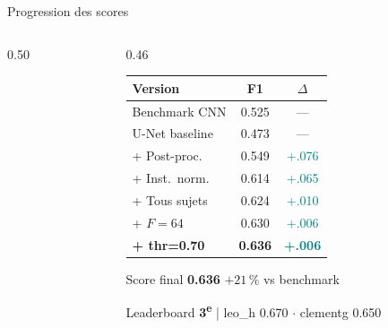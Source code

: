 \documentclass[aspectratio=169, 10pt]{beamer}
\begin{document}
\begin{frame}{Progression des scores}
    \begin{columns}[T]
        \begin{column}{0.50\textwidth}
        \end{column}
        \begin{column}{0.46\textwidth}
            \small
            \begin{tabular}{@{}lcc@{}}
                \toprule
                \textbf{Version} & \textbf{F1} & \textbf{$\Delta$} \\
                \midrule
                Benchmark CNN       & 0.525 & ---  \\
                U-Net baseline      & 0.473 & ---  \\
                + Post-proc.        & 0.549 & \textcolor{Teal}{+.076} \\
                + Inst.\ norm.      & 0.614 & \textcolor{Teal}{+.065} \\
                + Tous sujets       & 0.624 & \textcolor{Teal}{+.010} \\
                + $F\!=\!64$        & 0.630 & \textcolor{Teal}{+.006} \\
                \textbf{+ thr=0.70} & \textbf{0.636} & \textcolor{Teal}{\textbf{+.006}} \\
                \bottomrule
            \end{tabular}
            \vspace{0.2cm}
            \begin{alertblock}{\centering\small Score final}
                \centering\normalsize\textbf{0.636} \;\;$+21\,\%$ vs benchmark
            \end{alertblock}
            \begin{exampleblock}{\centering\small Leaderboard}
                \centering\small \textbf{3\textsuperscript{e}} \;|\;
                leo\_h 0.670 $\cdot$ clementg 0.650
            \end{exampleblock}
        \end{column}
    \end{columns}
\end{frame}
\end{document}

